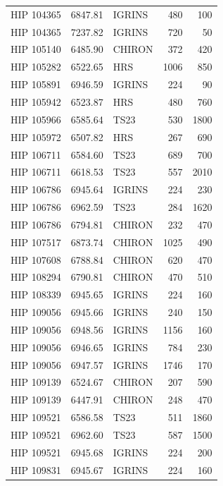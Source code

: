 \begin{scriptsize}
\begin{longtable}{|l|rlrr|}
  HIP 104365 &  6847.81 &     IGRINS &      480 &   100 \\
  HIP 104365 &  7237.82 &     IGRINS &      720 &    50 \\
  HIP 105140 &  6485.90 &     CHIRON &      372 &   420 \\
  HIP 105282 &  6522.65 &        HRS &     1006 &   850 \\
  HIP 105891 &  6946.59 &     IGRINS &      224 &    90 \\
  HIP 105942 &  6523.87 &        HRS &      480 &   760 \\
  HIP 105966 &  6585.64 &       TS23 &      530 &  1800 \\
  HIP 105972 &  6507.82 &        HRS &      267 &   690 \\
  HIP 106711 &  6584.60 &       TS23 &      689 &   700 \\
  HIP 106711 &  6618.53 &       TS23 &      557 &  2010 \\
  HIP 106786 &  6945.64 &     IGRINS &      224 &   230 \\
  HIP 106786 &  6962.59 &       TS23 &      284 &  1620 \\
  HIP 106786 &  6794.81 &     CHIRON &      232 &   470 \\
  HIP 107517 &  6873.74 &     CHIRON &     1025 &   490 \\
  HIP 107608 &  6788.84 &     CHIRON &      620 &   470 \\
  HIP 108294 &  6790.81 &     CHIRON &      470 &   510 \\
  HIP 108339 &  6945.65 &     IGRINS &      224 &   160 \\
  HIP 109056 &  6945.66 &     IGRINS &      240 &   150 \\
  HIP 109056 &  6948.56 &     IGRINS &     1156 &   160 \\
  HIP 109056 &  6946.65 &     IGRINS &      784 &   230 \\
  HIP 109056 &  6947.57 &     IGRINS &     1746 &   170 \\
  HIP 109139 &  6524.67 &     CHIRON &      207 &   590 \\
  HIP 109139 &  6447.91 &     CHIRON &      248 &   470 \\
  HIP 109521 &  6586.58 &       TS23 &      511 &  1860 \\
  HIP 109521 &  6962.60 &       TS23 &      587 &  1500 \\
  HIP 109521 &  6945.68 &     IGRINS &      224 &   200 \\
  HIP 109831 &  6945.67 &     IGRINS &      224 &   160 \\

\end{longtable}
\end{scriptsize}
